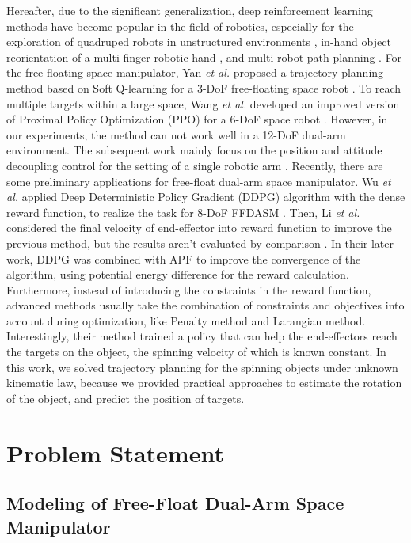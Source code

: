 \documentclass{article}
\begin{document}
Hereafter, due to the significant generalization, deep reinforcement learning methods have become popular in the field of robotics, especially for the exploration of quadruped robots in unstructured environments \cite{lee2020learning,tsounis2020deepgait}, in-hand object reorientation of a multi-finger robotic hand \cite{andrychowicz2020learning,chen2022system}, and multi-robot path planning \cite{long2018optimally,prianto2020path,ha2020learning}.  For the free-floating space manipulator, Yan \emph{et al.} proposed a trajectory planning method based on Soft Q-learning for a 3-DoF free-floating space robot \cite{yan2018control}. To reach multiple targets within a large space, Wang \emph{et al.} developed an improved version of Proximal Policy Optimization (PPO) for a 6-DoF space robot \cite{Wang20221multi}. However, in our experiments, the method can not work well in a 12-DoF dual-arm environment. The subsequent work mainly focus on the position and attitude decoupling control for the setting of a single robotic arm \cite{wang2022collision}. Recently, there are some preliminary applications for free-float dual-arm space manipulator. Wu \emph{et al.} applied Deep Deterministic Policy Gradient (DDPG) algorithm with the dense reward function, to realize the task for 8-DoF FFDASM \cite{2020Reinforcement}. Then,  Li \emph{et al.} considered the final velocity of end-effector into reward function to improve the previous method, but the results aren't evaluated by comparison \cite{li2021constrained}. In their later work, DDPG was combined with APF to improve the convergence of the algorithm, using potential energy difference for the reward calculation\cite{li2022constrained}. Furthermore, instead of introducing the constraints in the reward function, advanced methods usually take the combination of constraints and objectives into account during optimization, like Penalty method and Larangian method. Interestingly, their method trained a policy that can help the end-effectors reach the targets on the object, the spinning velocity of which is known constant. In this work, we solved trajectory planning for the spinning objects under unknown kinematic law, because we provided practical approaches to estimate the rotation of the object, and predict the position of targets. 

\section{Problem Statement}
\subsection{Modeling of Free-Float Dual-Arm Space Manipulator}
\end{document}
